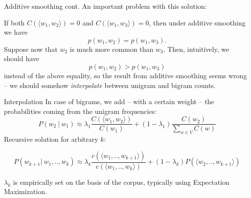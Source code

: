 \documentclass[style=upen, size=14pt]{powerdot}
\theoremstyle{definition}
\begin{document}
\begin{slide}[toc=]{Additive smoothing cont.}
  An important problem with this solution:

  If both $C(\langle w_1,w_2\rangle)=0$ and $C(\langle w_1,w_3\rangle)=0$, then under
  additive smoothing we have 
  $$ p(w_1,w_2)=p(w_1,w_3).$$
  Suppose now that $w_2$ is much more common than $w_3$. Then, intuitively, we
  should have 
  $$ p(w_1,w_2)>p(w_1,w_3)$$
  instead of the above equality, so the result from additive smoothing seems
  wrong -- we should somehow \emph{interpolate} between unigram and bigram
  counts.
\end{slide}

\begin{slide}[toc=Interpolation]{Interpolation}
  In case of bigrams, we add -- with a certain weight -- the probabilities coming
  from the unigram frequencies:
$$P(w_2 ~\vert ~w_1) \approx \lambda_1\frac{C(\langle w_1, w_2 \rangle)}{C(w_1)} + (1 - \lambda_1)\frac{C(w_2)}{\sum_{w\in V}C(w)}$$
Recursive solution for arbitrary $k$:
\begin{small}
$$P(w_{k+1} \vert~ w_1,.., w_k) \approx \lambda_k\frac{c(\langle w_1 ,.., w_{k+1} \rangle)}{c(\langle w_1 ,.., w_k\rangle)} + (1-\lambda_k)P(\langle w_2 ,.., w_{k+1}\rangle)$$
\end{small}
$\lambda_k$ is empirically set on the basis of the corpus, typically using
Expectation Maximization.


\end{slide}
\end{document}
